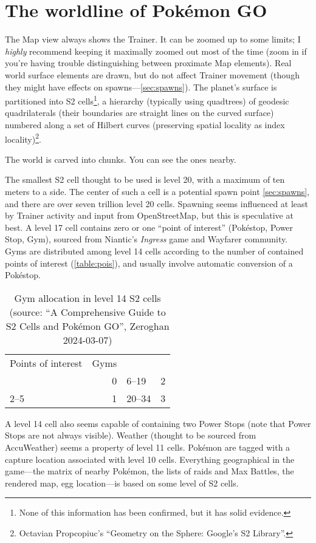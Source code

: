 \section{The worldline of Pokémon GO\label{sec:world}}
The Map view always shows the Trainer.
It can be zoomed up to some limits; I \textit{highly} recommend keeping it
 maximally zoomed out most of the time (zoom in if you're having trouble
 distinguishing between proximate Map elements).
Real world surface elements are drawn, but do not affect Trainer movement
 (though they might have effects on spawns---\autoref{sec:spawns}).
The planet's surface is partitioned into S2 cells\footnote{None of this information has been confirmed, but it has solid evidence.}, a hierarchy (typically using
 quadtrees) of geodesic quadrilaterals (their boundaries are straight lines on the curved
 surface) numbered along a set of Hilbert curves (preserving spatial locality as index locality)\footnote{Octavian Propcopiuc's ``Geometry on the Sphere: Google's S2 Library''.}.
\begin{tipbox}[title=If that meant nothing to you…]
The world is carved into chunks. You can see the ones nearby.
\end{tipbox}
The smallest S2 cell thought to be used is level 20, with a maximum of ten meters to a side.
The center of such a cell is a potential spawn point \autoref{sec:spawns}, and there are over seven trillion level 20 cells.
Spawning seems influenced at least by Trainer activity and input from OpenStreetMap, but this is speculative at best.
A level 17 cell contains zero or one ``point of interest'' (Pokéstop, Power Stop, Gym),
 sourced from Niantic's \textit{Ingress} game and Wayfarer community.
Gyms are distributed among level 14 cells according to the number of contained points of interest (\autoref{table:pois}),
 and usually involve automatic conversion of a Pokéstop.
\begin{table}
\centering
\begin{tabular}{lr|lr}
Points of interest & Gyms\\
\Midrule
1 & 0 & 6--19 & 2\\
2--5 & 1 & 20--34 & 3\\
\end{tabular}
\caption[Gym allocation in level 14 S2 cells]{Gym allocation in level 14 S2 cells (source: ``A Comprehensive Guide to S2 Cells and Pokémon GO'', Zeroghan 2024-03-07)\label{table:pois}}
\end{table}
A level 14 cell also seems capable of containing two Power Stops (note that Power Stops are not always visible).
 Weather (thought to be sourced from AccuWeather) seems a property of level 11 cells.
Pokémon are tagged with a capture location associated with level 10 cells.
Everything geographical in the game---the matrix of nearby Pokémon, the lists
 of raids and Max Battles, the rendered map, egg location---is based on some level of S2 cells.
